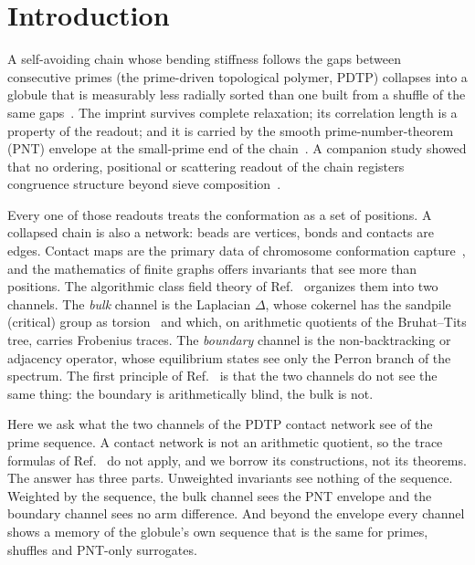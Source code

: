 \documentclass[reprint,amsmath,amssymb,aps,pre,longbibliography]{revtex4-2}
\begin{document}
\section{Introduction}

A self-avoiding chain whose bending stiffness follows the gaps between consecutive primes (the
prime-driven topological polymer, PDTP) collapses into a globule that is measurably less radially
sorted than one built from a shuffle of the same gaps~\cite{PDTP4}. The imprint survives complete
relaxation; its correlation length is a property of the readout; and it is carried by the smooth
prime-number-theorem (PNT) envelope at the small-prime end of the chain~\cite{PDTP4,Merged}. A
companion study showed that no ordering, positional or scattering readout of the chain registers
congruence structure beyond sieve composition~\cite{Paper3}.

Every one of those readouts treats the conformation as a set of positions. A collapsed chain is
also a network: beads are vertices, bonds and contacts are edges. Contact maps are the primary data
of chromosome conformation capture~\cite{LiebermanAiden}, and the mathematics of finite graphs
offers invariants that see more than positions. The algorithmic class field theory of
Ref.~\cite{ANCCFT} organizes them into two channels. The \emph{bulk} channel is the Laplacian
$\Delta$, whose cokernel has the sandpile (critical) group as torsion~\cite{Biggs} and which, on
arithmetic quotients of the Bruhat--Tits tree, carries Frobenius traces. The \emph{boundary}
channel is the non-backtracking or adjacency operator, whose equilibrium states see only the Perron
branch of the spectrum. The first principle of Ref.~\cite{ANCCFT} is that the two channels do not
see the same thing: the boundary is arithmetically blind, the bulk is not.

Here we ask what the two channels of the PDTP contact network see of the prime sequence. A contact
network is not an arithmetic quotient, so the trace formulas of Ref.~\cite{ANCCFT} do not apply,
and we borrow its constructions, not its theorems. The answer has three parts. Unweighted
invariants see nothing of the sequence. Weighted by the sequence, the bulk channel sees the PNT
envelope and the boundary channel sees no arm difference. And beyond the envelope every channel
shows a memory of the globule's own sequence that is the same for primes, shuffles and
PNT-only surrogates.
\end{document}
